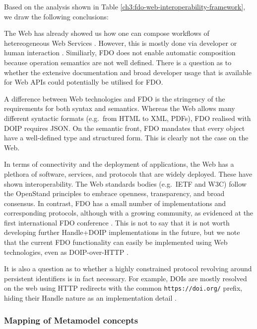 Based on the analysis shown in Table \ref{ch3:fdo-web-interoperability-framework}, we draw the following conclusions:

The Web has already showed us how one can compose workflows of hetereogeneous Web Services \cite{wolstencroftTavernaWorkflowSuite2013d}. However, this is mostly done via developer or human interaction \cite{lamprechtPerspectivesAutomatedComposition2021b}. Similiarly, FDO does not enable automatic composition because operation semantics are not well defined. There is a question as to whether the extensive documentation and broad developer usage that is available for Web APIs could potentially be utilised for FDO.

A difference between Web technologies and FDO is the stringency of the requirements for both syntax and semantics. Whereas the Web allows many different syntactic formats (e.g.~from HTML to XML, PDFs), FDO realised with DOIP requires JSON. On the semantic front, FDO mandates that every object have a well-defined type and structured form. This is clearly not the case on the Web.

In terms of connectivity and the deployment of applications, the Web has a plethora of software, services, and protocols that are widely deployed. These have shown interoperability. The Web standards bodies (e.g.~IETF and W3C) follow the OpenStand principles \cite{ModernStandardsParadigm} to embrace openness, transparency, and broad consensus. In contrast, FDO has a small number of implementations and corresponding protocols, although with a growing community, as evidenced at the first international FDO conference \cite{looFirstInternationalConference2022}. This is not to say that it is not worth developing further Handle+DOIP implementations in the future, but we note that the current FDO functionality can easily be implemented using Web technologies, even as DOIP-over-HTTP \cite{DOIPAPIHTTPa}.

It is also a question as to whether a highly constrained protocol revolving around persistent identifiers is in fact necessary. For example, DOIs are mostly resolved on the web using HTTP redirects with the common \texttt{https://doi.org/} prefix, hiding their Handle nature as an implementation detail \cite{DOIHandbookResolution}.


\subsubsection{Mapping of Metamodel concepts}\label{ch3:mapping-of-metamodel-concepts}


